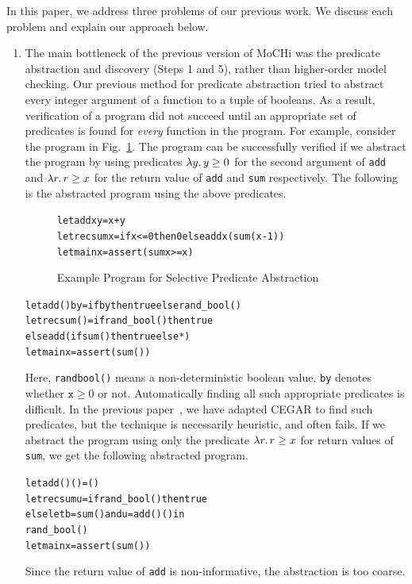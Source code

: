 In this paper, we address three problems of our previous work.
We discuss each problem and explain our approach below.

\begin{enumerate}
\item The main bottleneck of the previous version of MoCHi was the
      predicate abstraction and discovery (Steps 1 and 5), rather than
      higher-order model checking. Our previous method for predicate
      abstraction tried to abstract every integer argument of a function
      to a tuple of booleans. As a result, verification of a program did
      not succeed until an appropriate set of predicates is found for
      \emph{every} function in the program.  For example, consider the
      program in Fig.~\ref{fig:sum}.  The program can be successfully
      verified if we abstract the program by using predicates
      $\lambda{y}.\,{y \geq 0}$ for the second argument of \texttt{add} and
      $\lambda{r}.\,{r \geq x}$ for the return value of \texttt{add} and
      \texttt{sum} respectively.  The following is the
      abstracted program using the above predicates.

\begin{figure}[t]
\begin{alltt}
let add x y = x + y
let rec sum x = if x <= 0 then 0 else add x (sum (x-1))
let main x = assert (sum x >= x)
\end{alltt}
\caption{Example Program for Selective Predicate Abstraction}
\label{fig:sum}
\end{figure}
\begin{alltt}
let add () by = if by then true else rand_bool()
let rec sum () = if rand_bool() then true
                else add (if sum () then true else *)
let main x = assert (sum ())
\end{alltt}
      Here, \texttt{rand\us{}bool()} means a non-deterministic boolean
      value.  \texttt{by} denotes whether $\mathtt{x} \geq 0$ or not.
      Automatically finding all such appropriate predicates is
      difficult.  In the previous paper~\cite{KobayashiPLDI2011}, we
      have adapted CEGAR to find such predicates, but the technique is
      necessarily heuristic, and often fails.  If we abstract the
      program using only the predicate $\lambda{r}.\,{r \geq x}$ for return
      values of \texttt{sum}, we get the following abstracted program.
\begin{alltt}
let add () () = ()
let rec sum u = if rand_bool() then true
                else let b = sum () and u = add () () in
                       rand_bool()
let main x = assert (sum ())
\end{alltt}
      Since the return value of \texttt{add} is non-informative, the
      abstraction is too coarse.


\end{enumerate}
